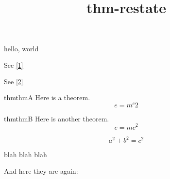 \documentclass{amsart}
\title{thm-restate}
\begin{document}
\maketitle

hello, world

See \ref{1}

See \ref{2}

\begin{restatable}{thm}{thmA}\label{1}
Here is a theorem.
\begin{equation}
e = m^c2
\end{equation}
\end{restatable}

\begin{restatable*}{thm}{thmB}\label{2}
Here is another theorem.
\begin{equation}
e = mc^2
\end{equation}
\end{restatable*}

\begin{equation}
a^2 + b^2 = c^2
\end{equation}

blah blah blah

And here they are again:

\thmA*

\thmB
\end{document}
